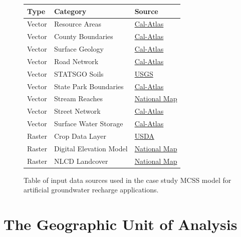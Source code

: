     \begin{figure}[!h]
        \begin{center}
            \begin{tabular*}{0.45\textwidth}{l | l | l}
                \textbf{Type} & \textbf{Category} & \textbf{Source} \\ \hline
                Vector & Resource Areas & \href{http://www.atlas.ca.gov/download.html}{Cal-Atlas} \\ \hline
                Vector & County Boundaries & \href{http://www.atlas.ca.gov/download.html}{Cal-Atlas} \\ \hline
                Vector & Surface Geology & \href{http://www.atlas.ca.gov/download.html}{Cal-Atlas} \\ \hline
                Vector & Road Network & \href{http://www.atlas.ca.gov/download.html}{Cal-Atlas} \\ \hline
                Vector & STATSGO Soils & \href{http://water.usgs.gov/GIS/metadata/usgswrd/XML/ussoils.xml#stdorder}{USGS} \\ \hline
                Vector & State Park Boundaries & \href{http://www.atlas.ca.gov/download.html}{Cal-Atlas} \\ \hline
                Vector & Stream Reaches & \href{http://viewer.nationalmap.gov/viewer/}{National Map} \\ \hline
                Vector & Street Network & \href{http://www.atlas.ca.gov/download.html}{Cal-Atlas} \\ \hline
                Vector & Surface Water Storage & \href{http://www.atlas.ca.gov/download.html}{Cal-Atlas} \\ \hline
                Raster & Crop Data Layer & \href{http://www.nass.usda.gov/research/Cropland/SARS1a.htm}{USDA} \\ \hline
                Raster & Digital Elevation Model & \href{http://viewer.nationalmap.gov/viewer/}{National Map} \\ \hline
                Raster & NLCD Landcover & \href{http://viewer.nationalmap.gov/viewer/}{National Map} \\ 
           \end{tabular*}
    \end{center}
    \caption{Table of input data sources used in the case study MCSS model for artificial groundwater recharge applications.}
    \label{fig:DataSources}
    \end{figure}

\section{The Geographic Unit of Analysis}
    
